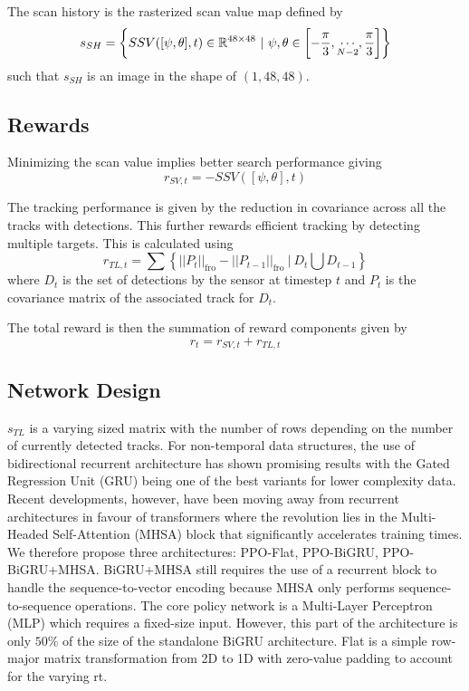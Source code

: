 The scan history is the rasterized scan value map defined by 
\begin{equation}
    s_{SH} = \left\{ SSV([\psi, \theta],t) \in \mathbb{R}^{48 \times 48} ~|~ \psi, \theta \in \left[-\frac{\pi}{3}, \operatornamewithlimits{\cdots}_{N-2}, \frac{\pi}{3}\right]\right\}
\end{equation}
such that $s_{SH}$ is an image in the shape of $(1,48,48)$.

\subsection{Rewards}

Minimizing the scan value implies better search performance giving
\begin{equation}
    r_{SV,t} = - SSV([\psi, \theta], t)
\end{equation}

The tracking performance is given by the reduction in covariance across all the tracks with detections. This further rewards efficient tracking by detecting multiple targets. This is calculated using
\begin{equation}
    r_{TL,t} = \sum \left\{ 
    ||P_t||_\mathrm{fro} - ||P_{t-1}||_\mathrm{fro} 
    ~|~
   D_t \bigcup D_{t-1} 
   \right\}
\end{equation}
where $D_t$ is the set of detections by the sensor at timestep $t$ and $P_t$ is the covariance matrix of the associated track for $D_t$.

The total reward is then the summation of reward components given by
\begin{equation}
    r_t =  r_{SV,t} + r_{TL,t}
\end{equation}

\subsection{Network Design}
\label{sect:network_design}

$s_{TL}$ is a varying sized matrix with the number of rows depending on the number of currently detected tracks. For non-temporal data structures, the use of bidirectional recurrent architecture has shown promising results \cite{Wang2020} with the Gated Regression Unit (GRU) \cite{Cahuantzi2023} being one of the best variants for lower complexity data. Recent developments, however, have been moving away from recurrent architectures in favour of transformers \cite{Vaswani2017} where the revolution lies in the Multi-Headed Self-Attention (MHSA) block that significantly accelerates training times. We therefore propose three architectures: PPO-Flat, PPO-BiGRU, PPO-BiGRU+MHSA.
BiGRU+MHSA still requires the use of a recurrent block to handle the sequence-to-vector encoding because MHSA only performs sequence-to-sequence operations. The core policy network is a Multi-Layer Perceptron (MLP) which requires a fixed-size input. However, this part of the architecture is only $50\%$ of the size of the standalone BiGRU architecture. Flat is a simple row-major matrix transformation from 2D to 1D with zero-value padding to account for the varying rt.

